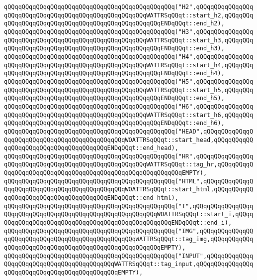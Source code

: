 \verb|qQQqqQQqqQQqqQQqqQQqqQQqqQQqqQQqqQQqqQQqqQQqqQQq("H2",qQQqqQQqqQQqqQQqqQQqqQQqqQQqqQQqqQQqqQQqqQQqqQQqqQQqqQQqWATTRSqQQqt::start_h2,qQQqqQQqqQQqqQQqqQQqqQQqqQQqqQQqqQQqqQQqqQQqqQQqqQQqENDqQQqt::end_h2),|\newline
\verb|qQQqqQQqqQQqqQQqqQQqqQQqqQQqqQQqqQQqqQQqqQQqqQQq("H3",qQQqqQQqqQQqqQQqqQQqqQQqqQQqqQQqqQQqqQQqqQQqqQQqqQQqqQQqWATTRSqQQqt::start_h3,qQQqqQQqqQQqqQQqqQQqqQQqqQQqqQQqqQQqqQQqqQQqqQQqqQQqENDqQQqt::end_h3),|\newline
\verb|qQQqqQQqqQQqqQQqqQQqqQQqqQQqqQQqqQQqqQQqqQQqqQQq("H4",qQQqqQQqqQQqqQQqqQQqqQQqqQQqqQQqqQQqqQQqqQQqqQQqqQQqqQQqWATTRSqQQqt::start_h4,qQQqqQQqqQQqqQQqqQQqqQQqqQQqqQQqqQQqqQQqqQQqqQQqqQQqENDqQQqt::end_h4),|\newline
\verb|qQQqqQQqqQQqqQQqqQQqqQQqqQQqqQQqqQQqqQQqqQQqqQQq("H5",qQQqqQQqqQQqqQQqqQQqqQQqqQQqqQQqqQQqqQQqqQQqqQQqqQQqqQQqWATTRSqQQqt::start_h5,qQQqqQQqqQQqqQQqqQQqqQQqqQQqqQQqqQQqqQQqqQQqqQQqqQQqENDqQQqt::end_h5),|\newline
\verb|qQQqqQQqqQQqqQQqqQQqqQQqqQQqqQQqqQQqqQQqqQQqqQQq("H6",qQQqqQQqqQQqqQQqqQQqqQQqqQQqqQQqqQQqqQQqqQQqqQQqqQQqqQQqWATTRSqQQqt::start_h6,qQQqqQQqqQQqqQQqqQQqqQQqqQQqqQQqqQQqqQQqqQQqqQQqqQQqENDqQQqt::end_h6),|\newline
\verb|qQQqqQQqqQQqqQQqqQQqqQQqqQQqqQQqqQQqqQQqqQQqqQQq("HEAD",qQQqqQQqqQQqqQQqqQQqqQQqqQQqqQQqqQQqqQQqqQQqqQQqWOATTRSqQQqt::start_head,qQQqqQQqqQQqqQQqqQQqqQQqqQQqqQQqqQQqqQQqENDqQQqt::end_head),|\newline
\verb|qQQqqQQqqQQqqQQqqQQqqQQqqQQqqQQqqQQqqQQqqQQqqQQq("HR",qQQqqQQqqQQqqQQqqQQqqQQqqQQqqQQqqQQqqQQqqQQqqQQqqQQqqQQqWATTRSqQQqt::tag_hr,qQQqqQQqqQQqqQQqqQQqqQQqqQQqqQQqqQQqqQQqqQQqqQQqqQQqqQQqqQQqEMPTY),|\newline
\verb|qQQqqQQqqQQqqQQqqQQqqQQqqQQqqQQqqQQqqQQqqQQqqQQq("HTML",qQQqqQQqqQQqqQQqqQQqqQQqqQQqqQQqqQQqqQQqqQQqqQQqWOATTRSqQQqt::start_html,qQQqqQQqqQQqqQQqqQQqqQQqqQQqqQQqqQQqqQQqENDqQQqt::end_html),|\newline
\verb|qQQqqQQqqQQqqQQqqQQqqQQqqQQqqQQqqQQqqQQqqQQqqQQq("I",qQQqqQQqqQQqqQQqqQQqqQQqqQQqqQQqqQQqqQQqqQQqqQQqqQQqqQQqqQQqWOATTRSqQQqt::start_i,qQQqqQQqqQQqqQQqqQQqqQQqqQQqqQQqqQQqqQQqqQQqqQQqqQQqENDqQQqt::end_i),|\newline
\verb|qQQqqQQqqQQqqQQqqQQqqQQqqQQqqQQqqQQqqQQqqQQqqQQq("IMG",qQQqqQQqqQQqqQQqqQQqqQQqqQQqqQQqqQQqqQQqqQQqqQQqqQQqWATTRSqQQqt::tag_img,qQQqqQQqqQQqqQQqqQQqqQQqqQQqqQQqqQQqqQQqqQQqqQQqqQQqqQQqEMPTY),|\newline
\verb|qQQqqQQqqQQqqQQqqQQqqQQqqQQqqQQqqQQqqQQqqQQqqQQq("INPUT",qQQqqQQqqQQqqQQqqQQqqQQqqQQqqQQqqQQqqQQqqQQqWATTRSqQQqt::tag_input,qQQqqQQqqQQqqQQqqQQqqQQqqQQqqQQqqQQqqQQqqQQqqQQqEMPTY),|\newline

